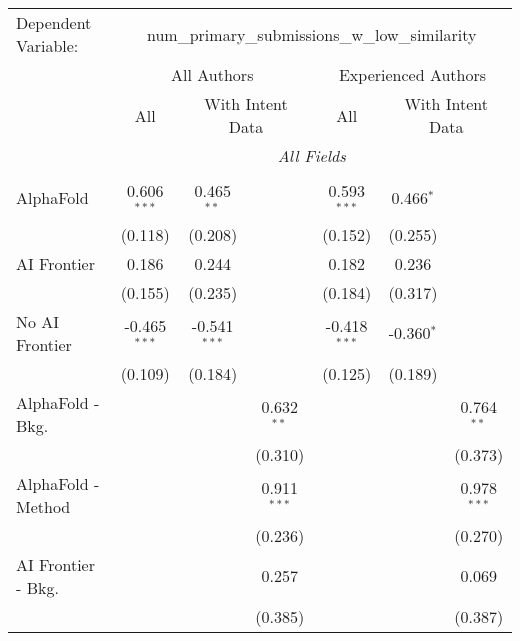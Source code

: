 \begingroup
\centering
\begin{tabular}{lcccccc}
   \tabularnewline \midrule \midrule
   Dependent Variable: & \multicolumn{6}{c}{num\_primary\_submissions\_w\_low\_similarity}\\
 & \multicolumn{3}{c}{All Authors} & \multicolumn{3}{c}{Experienced Authors} \\
\cmidrule(lr){2-4} \cmidrule(lr){5-7}
 & \multicolumn{1}{c}{All} & \multicolumn{2}{c}{With Intent Data} & \multicolumn{1}{c}{All} & \multicolumn{2}{c}{With Intent Data} \\
\cmidrule(lr){2-2} \cmidrule(lr){3-4} \cmidrule(lr){5-5} \cmidrule(lr){6-7}
 & \multicolumn{6}{c}{\textit{All Fields}} \\ \\
   AlphaFold               & 0.606$^{***}$  & 0.465$^{**}$   &               & 0.593$^{***}$  & 0.466$^{*}$  &   \\   
                           & (0.118)        & (0.208)        &               & (0.152)        & (0.255)      &   \\   
   AI Frontier             & 0.186          & 0.244          &               & 0.182          & 0.236        &   \\   
                           & (0.155)        & (0.235)        &               & (0.184)        & (0.317)      &   \\   
   No AI Frontier          & -0.465$^{***}$ & -0.541$^{***}$ &               & -0.418$^{***}$ & -0.360$^{*}$ &   \\   
                           & (0.109)        & (0.184)        &               & (0.125)        & (0.189)      &   \\   
   AlphaFold - Bkg.        &                &                & 0.632$^{**}$  &                &              & 0.764$^{**}$\\   
                           &                &                & (0.310)       &                &              & (0.373)\\   
   AlphaFold - Method      &                &                & 0.911$^{***}$ &                &              & 0.978$^{***}$\\   
                           &                &                & (0.236)       &                &              & (0.270)\\   
   AI Frontier - Bkg.      &                &                & 0.257         &                &              & 0.069\\   
                           &                &                & (0.385)       &                &              & (0.387)\\   

\end{tabular}
